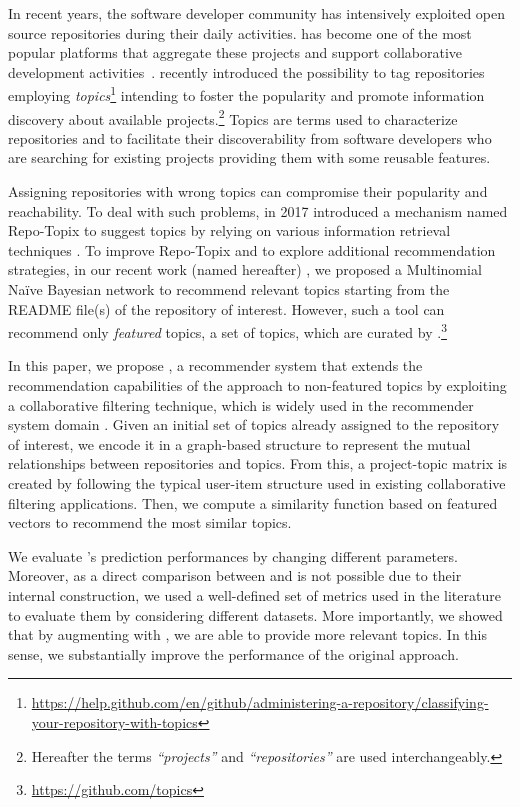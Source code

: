In recent years, the software developer community has intensively exploited open source 
repositories during their daily activities. \GH has become one of the most
popular platforms that aggregate these projects and support collaborative 
development activities~\cite{7832894}. \GH recently introduced the possibility 
to tag repositories employing 
\emph{topics}\footnote{\url{https://help.github.com/en/github/administering-a-repository/classifying-your-repository-with-topics}}
 intending to foster the popularity and promote information discovery about 
available projects.\footnote{Hereafter the terms \GH  \emph{``projects''} and \emph{``repositories''} 
are used 
interchangeably.} Topics are terms used to characterize repositories and to 
facilitate their discoverability from software developers who are searching 
for existing projects providing them with some reusable features. 

Assigning repositories with wrong topics can compromise their popularity and 
reachability. To deal with such problems, in 2017 \GH introduced a 
mechanism named Repo-Topix to suggest topics by relying on various information 
retrieval techniques \cite{repo-topix}. To improve Repo-Topix 
and to explore additional recommendation strategies, in our recent work (named \MNB 
hereafter) \cite{10.1145/3383219.3383227}, we proposed a Multinomial Na\"ive Bayesian network to 
recommend relevant topics starting from the README file(s) of the repository of 
interest. However, such a tool can recommend 
only \emph{featured} topics, \ie a set of topics, which are curated by 
\GH.\footnote{\url{https://github.com/topics}}


In this paper, we propose \TF, a recommender system that extends the 
recommendation capabilities of the \MNB approach to 
non-featured topics by exploiting a collaborative filtering technique, which is 
widely used in the recommender system domain 
\cite{Schafer:2007:CFR:1768197.1768208}. Given an initial set of topics already 
assigned to the \GH repository of interest, we encode it in a graph-based 
structure to represent the mutual relationships between repositories and 
topics. From this, a project-topic matrix is created by following the 
typical user-item structure used in existing collaborative filtering 
applications. Then, we compute a similarity function based on featured vectors 
to recommend the most similar topics.

We evaluate \TF's prediction performances by changing different parameters. 
Moreover, as a direct comparison between \TF and \MNB is not
possible due to their internal construction, we used a well-defined set of 
metrics used in the literature to evaluate them by 
considering different datasets. More importantly, we showed that by augmenting \MNB with \TF, we are able to provide more relevant topics. %
In this sense, we substantially improve the performance of the original \MNB approach.


